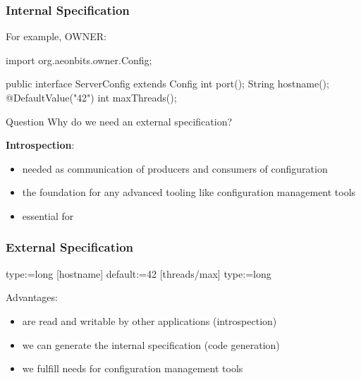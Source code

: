 \begin{frame}[fragile]
	\frametitle{Internal Specification}

	For example, OWNER:
	\begin{code}[gobble=4,language=Java]
	import org.aeonbits.owner.Config;

	public interface ServerConfig extends Config {
		int port();
		String hostname();
		@DefaultValue("42")
		int maxThreads();
	}
	\end{code}
\end{frame}

\begin{frame}
	\begin{alertblock}{Question}
	Why do we need an external specification?
	\end{alertblock}

	\pause
	\vspace{1em}

	\textbf{Introspection}:
	\begin{itemize}
	\item needed as communication of producers and consumers of configuration
	\item the foundation for any advanced tooling like configuration management tools
	\item essential for ~\citet{holland2001nofutz}
	\end{itemize}
\end{frame}

\begin{frame}[fragile]
	\frametitle{External Specification}

	\begin{code}[gobble=4]
	[port]
	type:=long
	[hostname]
	default:=42
	[threads/max]
	type:=long
	\end{code}

	\vspace{1em}

	Advantages:
	\pause
	\begin{itemize}
	\item are read and writable by other applications (introspection)
	\item we can generate the internal specification (code generation)
	\item we fulfill needs for configuration management tools
	\end{itemize}
\end{frame}



